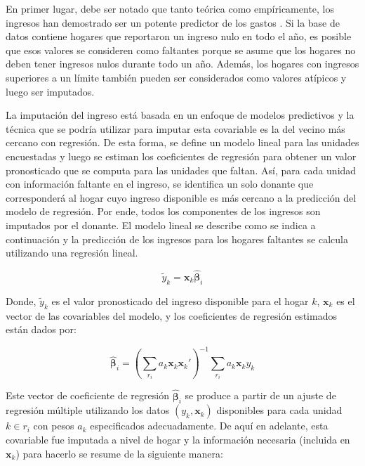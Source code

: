 \documentclass[
  10pt,
  spanish,
]{book}
\begin{document}
En primer lugar, debe ser notado que tanto teórica como empíricamente, los ingresos han demostrado ser un potente predictor de los gastos \citep{Starick_Watson_2011}. Si la base de datos contiene hogares que reportaron un ingreso nulo en todo el año, es posible que esos valores se consideren como faltantes porque se asume que los hogares no deben tener ingresos nulos durante todo un año. Además, los hogares con ingresos superiores a un límite también pueden ser considerados como valores atípicos y luego ser imputados.

La imputación del ingreso está basada en un enfoque de modelos predictivos y la técnica que se podría utilizar para imputar esta covariable es la del vecino más cercano con regresión. De esta forma, se define un modelo lineal para las unidades encuestadas y luego se estiman los coeficientes de regresión para obtener un valor pronosticado que se computa para las unidades que faltan. Así, para cada unidad con información faltante en el ingreso, se identifica un solo donante que corresponderá al hogar cuyo ingreso disponible es más cercano a la predicción del modelo de regresión. Por ende, todos los componentes de los ingresos son imputados por el donante. El modelo lineal se describe como se indica a continuación y la predicción de los ingresos para los hogares faltantes se calcula utilizando una regresión lineal.

\[\tilde{y}_k = \mathbf{x}_k \hat{\boldsymbol{\beta}}_i\]

Donde, \(\tilde{y}_k\) es el valor pronosticado del ingreso disponible para el hogar \(k\), \(\mathbf{x}_k\) es el vector de las covariables del modelo, y los coeficientes de regresión estimados están dados por:

\[
\hat{\boldsymbol{\beta}}_i = (\sum_{r_i} a_k\mathbf{x}_k\mathbf{x}_k')^{-1}
\sum_{r_i} a_k\mathbf{x}_ky_k
\]

Este vector de coeficiente de regresión \(\hat{\boldsymbol{\beta}}_i\) se produce a partir de un ajuste de regresión múltiple utilizando los datos \((y_k, \mathbf{x}_k)\) disponibles para cada unidad \(k \in r_i\) con pesos \(a_k\) especificados adecuadamente. De aquí en adelante, esta covariable fue imputada a nivel de hogar y la información necesaria (incluida en \(\mathbf{x}_k\)) para hacerlo se resume de la siguiente manera:
\end{document}
